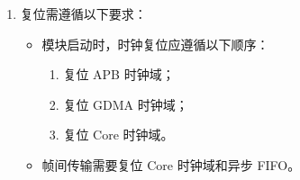 \documentclass[main\_\_CN.tex]{subfiles}
\begin{document}
\begin{enumerate}
    RX 模块中的具体操作步骤为：
    \begin{itemize}
        \item 清除 \hyperref[fielddesc:HPSYSCLKRSTPARLIORXCLKEN]{HP\_SYS\_CLKRST\_PARLIO\_RX\_CLK\_EN} 关闭 RX Core 时钟域；
        \item 向 \hyperref[fielddesc:PARLIORXSTART]{PARL\_IO\_RX\_START} 写 1；
        \item 置位 \hyperref[fielddesc:HPSYSCLKRSTPARLIORXCLKEN]{HP\_SYS\_CLKRST\_PARLIO\_RX\_CLK\_EN} 打开 RX Core 时钟域；
        \item 操作外部设备，使其开始发送数据；
        \item 清除 \hyperref[fielddesc:HPSYSCLKRSTPARLIORXCLKEN]{HP\_SYS\_CLKRST\_PARLIO\_RX\_CLK\_EN} 关闭 RX Core 时钟域；
        \item 向 \hyperref[fielddesc:PARLIOTXSTART]{PARL\_IO\_TX\_START} 写 0。
    \end{itemize}
    TX 模块中的具体操作步骤为：
    \begin{itemize}
        \item 清除 \hyperref[fielddesc:HPSYSCLKRSTPARLIOTXCLKEN]{HP\_SYS\_CLKRST\_PARLIO\_TX\_CLK\_EN} 关闭 TX Core 时钟域；
        \item 向 \hyperref[fielddesc:PARLIOTXSTART]{PARL\_IO\_TX\_START} 写 1；
        \item 置位 \hyperref[fielddesc:HPSYSCLKRSTPARLIOTXCLKEN]{HP\_SYS\_CLKRST\_PARLIO\_TX\_CLK\_EN} 打开 TX Core 时钟域；
        \item 操作外部设备，使其开始接收数据；
        \item 清除 \hyperref[fielddesc:HPSYSCLKRSTPARLIOTXCLKEN]{HP\_SYS\_CLKRST\_PARLIO\_TX\_CLK\_EN} 关闭 TX Core 时钟域；
        \item 向 \hyperref[fielddesc:PARLIOTXSTART]{PARL\_IO\_TX\_START} 写 0。
    \end{itemize}

    \item 复位需遵循以下要求：
    \begin{itemize}
        \item 模块启动时，时钟复位应遵循以下顺序：
        \begin{enumerate}
            \item 复位 APB 时钟域；
            \item 复位 GDMA 时钟域；
            \item 复位 Core 时钟域。
        \end{enumerate}
        \item 帧间传输需要复位 Core 时钟域和异步 FIFO。
    \end{itemize}
\end{enumerate}
\end{document}
